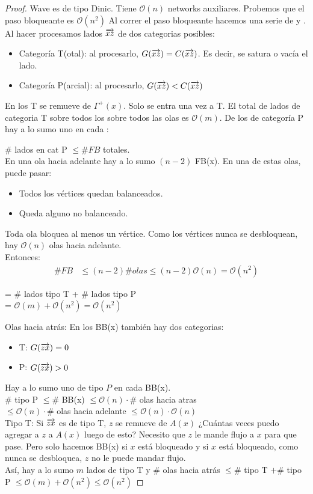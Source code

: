 \begin{proof}
Wave es de tipo Dinic. Tiene $\mathcal{O}(n)$ networks auxiliares. Probemos que el paso bloqueante es $\mathcal{O}(n^2)$
Al correr el paso bloqueante hacemos una serie de  y .
Al hacer  procesamos lados $\overrightarrow{xz}$ de dos categorias posibles:
\begin{itemize}
    \item Categoría T(otal): al procesarlo, $G(\overrightarrow{xz}) = C(\overrightarrow{xz})$. Es decir, se satura o vacía el lado.
    \item Categoría P(arcial): al procesarlo, $G(\overrightarrow{xz}) < C(\overrightarrow{xz})$
\end{itemize}
En los T se remueve de $\Gamma^+(x)$. Solo se entra una vez a T.
El total de lados de categoria T sobre todos los  sobre todos las olas es $\mathcal{O}(m)$.
De los de categoría P hay a lo sumo uno en cada :

$\#$ lados en cat P $\le \#FB$ totales.\\
En una ola hacia adelante hay a lo sumo $(n-2)$ FB(x).
En una de estas olas, puede pasar:
\begin{itemize}
    \item Todos los vértices quedan balanceados.
    \item Queda alguno no balanceado.
\end{itemize}
Toda ola bloquea al menos un vértice.
Como los vértices nunca se desbloquean, hay $\mathcal{O}(n)$ olas hacia adelante.\\
Entonces:
\begin{align}
\#FB &\le (n-2) \# olas
     \le (n-2) \mathcal{O}(n) = \mathcal{O}(n^2)
\end{align}

 = \# lados tipo T + \# lados tipo P\\
= $\mathcal{O}(m) + \mathcal{O}(n^2) = \mathcal{O}(n^2)$

Olas hacia atrás:
En los BB(x) también hay dos categorias:\begin{itemize}
    \item T: $G(\overrightarrow{zx})  = 0$
    \item P: $G(\overrightarrow{zx}) > 0$
\end{itemize}
Hay a lo sumo uno de tipo $P$ en cada BB(x).\\
$\#$ tipo P $\le \#$ BB(x)
$\le \mathcal{O}(n) \cdot \#$ olas hacia atras \\
$\le \mathcal{O}(n) \cdot \#$ olas hacia adelante
$\le \mathcal{O}(n) \cdot \mathcal{O}(n)$\\

Tipo T:
Si $\overrightarrow{zx}$ es de tipo T, $z$ se remueve de $A(x)$
¿Cuántas veces puedo agregar a $z$ a $A(x)$ luego de esto?
Necesito que $z$ le mande flujo a $x$ para que pase.
Pero solo hacemos BB(x) si $x$ está bloqueado y si $x$ está bloqueado, como nunca se desbloquea, $z$ no le puede mandar flujo.\\
Así, hay a lo sumo $m$ lados de tipo T y $\#$ olas hacia atrás $\le \#$ tipo T $+ \#$ tipo P
$\le \mathcal{O}(m) + \mathcal{O}(n^2)
\le \mathcal{O}(n^2)$
\end{proof}

